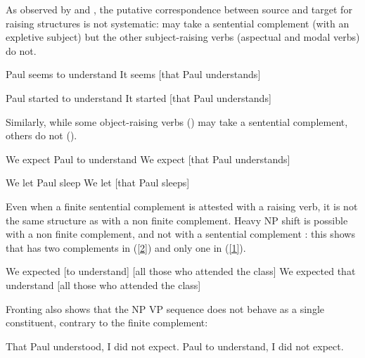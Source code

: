 \documentclass[output=paper]{langsci/langscibook}
\begin{document}
 As observed by \citet{Bresnan1982} and \citet{SagandPollard1991}, the putative correspondence between source and target for raising structures is not systematic:  may take a sentential complement (with an expletive subject) but the other subject-raising verbs (aspectual and modal verbs) do not. 


\begin{exe}
\ex \begin{xlist}
\ex  Paul seems to understand
\ex It seems [that Paul understands]	
\end{xlist}
\ex \begin{xlist}
 	\ex Paul started to understand
 	\ex *It started [that Paul understands]
 \end{xlist}
 \end{exe}
 
 Similarly, while some object-raising verbs () may take a sentential complement, others do not ().
 
 \begin{exe}
\ex \begin{xlist}
\ex We expect Paul to understand	\label{2}
\ex We expect [that Paul understands] \label{1}
\end{xlist}
\ex \begin{xlist}
\ex We let Paul sleep
\ex * We let [that Paul sleeps]
\end{xlist}	
\end{exe}

Even when a finite sentential complement is attested with a raising verb, it is not the same structure as  with a non finite complement. Heavy NP shift is possible with a non finite complement, and not with a sentential complement \citet{Bresnan1982}: this shows that  has two complements in (\ref{2}) and only one in (\ref{1}).

 \begin{exe}
\ex \begin{xlist}
\ex We expected [to understand] [all those who attended the class] \label{HNPS}
\ex * We expected that understand [all those who attended the class]
\end{xlist}	
\end{exe}

Fronting also shows that the NP VP sequence does not behave as a single constituent, contrary to the finite complement:

 \begin{exe}
\ex \begin{xlist}
\ex That Paul understood, I did not expect.
\ex * Paul to understand, I did not expect.
\end{xlist}	
\end{exe}
\end{document}
